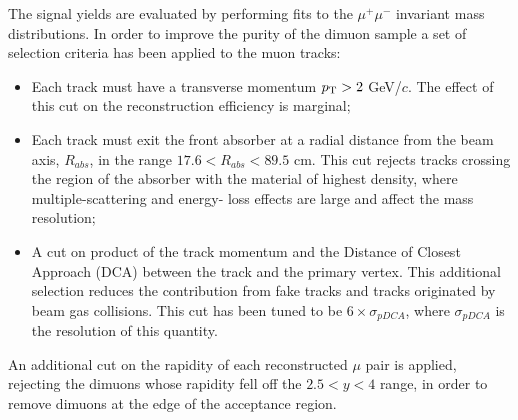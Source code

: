 The signal yields are evaluated by performing fits to the $\mu^+\mu^-$ invariant mass distributions.
In order to improve the purity of the dimuon sample a set of selection criteria has been applied to the muon tracks:
\begin{itemize}
\item Each track must have a transverse momentum $p_{\rm T} > 2$ GeV/$c$. 
The effect of this cut on the reconstruction efficiency is marginal;
\item Each track must exit the front absorber at a radial distance from the beam axis, $R_{abs}$, in the range $17.6 <R_{abs}< 89.5$ cm. This cut rejects tracks crossing the region of the absorber with the material of highest density, where multiple-scattering and energy- loss effects are large and affect the mass resolution;
\item A cut on product of the track momentum and the Distance of Closest Approach (DCA) between the track and the primary vertex. This additional selection reduces the contribution from fake tracks and tracks originated by beam gas collisions. This cut has been tuned to be $6\times\sigma_{pDCA}$, where $\sigma_{pDCA}$ is the resolution of this quantity.

\end{itemize}
An additional cut on the rapidity of each reconstructed $\mu$ pair is applied, rejecting the dimuons whose rapidity fell off the $2.5 < y < 4$ range, in order to remove dimuons at the edge of the acceptance region.

